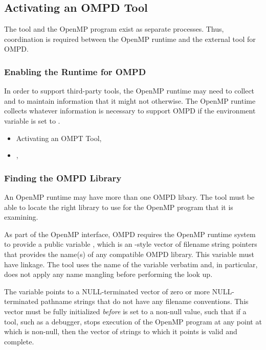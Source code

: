 \subsection{Activating an OMPD Tool}
\label{subsec:activating}

The tool and the OpenMP program exist as separate processes. 
Thus, coordination is required between the OpenMP runtime
and the external tool for OMPD.

\subsubsection{Enabling the Runtime for OMPD}
\label{subsubsec:enabling-ompd}

In order to support third-party tools, the OpenMP runtime may need to collect
and to maintain information that it might not otherwise. The OpenMP runtime 
collects whatever information is necessary to support OMPD if the environment 
variable  is set to .

\crossreferences
\begin{itemize}
\item Activating an OMPT Tool, 

\item   {}, 
\end{itemize}



\subsubsection{Finding the OMPD Library}
\label{subsubsec:finding-the-ompd}

An OpenMP runtime may have more than one OMPD libary. The tool must be able 
to locate the right library to use for the OpenMP program that it is examining.

As part of the OpenMP interface, OMPD requires the OpenMP runtime system to
provide a public variable , which is an -style
vector of filename string pointers that provides the name(s) of any compatible 
OMPD library. This variable must have  linkage. The tool uses the name 
of the variable verbatim and, in particular, does not apply any name mangling 
before performing the look up.

The  variable points to a NULL-terminated vector of 
zero or more NULL-terminated pathname strings that do not have any filename 
conventions. This vector must be fully initialized \emph{before} 
 is set to a non-null value, such that if a tool, 
such as a debugger, stops execution of the OpenMP program at any point at 
which  is non-null, then the vector of strings to 
which it points is valid and complete.

